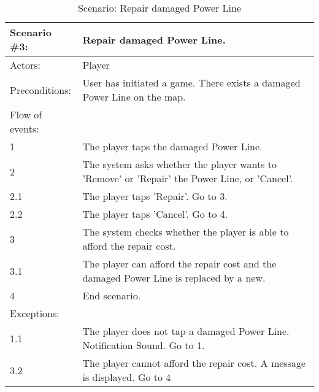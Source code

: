 \begin{table}
	\begin{tabular}{| l | p{10cm} |}
		\hline
		\rowcolor{lightgray}
		{\bf Scenario \#3:} & {\bf Repair damaged Power Line.} \\ \hline
		Actors: & Player \\ \hline
		Preconditions: & User has initiated a game. There exists a damaged Power Line on the map. \\ \hline
		Flow of events: & \\ \hline
		1 & The player taps the damaged Power Line. \\ \hline
		2 & The system asks whether the player wants to 'Remove' or 'Repair' the Power Line, or 'Cancel'. \\ \hline
		2.1 & The player taps 'Repair'. Go to 3. \\ \hline
		2.2 & The player taps 'Cancel'. Go to 4. \\ \hline
		3 & The system checks whether the player is able to afford the repair cost. \\ \hline
		3.1 & The player can afford the repair cost and the damaged Power Line is replaced by a new. \\ \hline
		4 & End scenario. \\ \hline
		Exceptions: & \\ \hline
		1.1 & The player does not tap a damaged Power Line. Notification Sound. Go to 1. \\ \hline
		3.2 & The player cannot afford the repair cost. A message is displayed. Go to 4 \\ \hline
	\end{tabular}
\caption{Scenario: Repair damaged Power Line}
\end{table}

